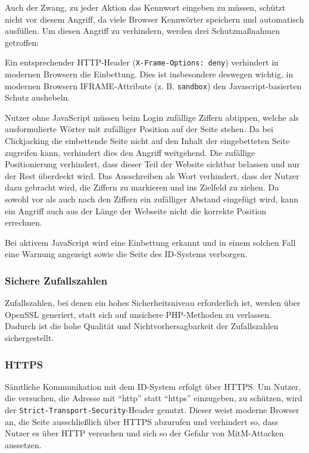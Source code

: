 \documentclass[parskip=half]{scrartcl}
\begin{document}
Auch der Zwang, zu jeder Aktion das Kennwort eingeben zu müssen, schützt nicht vor diesem Angriff, da viele Browser Kennwörter speichern und automatisch ausfüllen.
Um diesen Angriff zu verhindern, werden drei Schutzmaßnahmen getroffen:

Ein entsprechender HTTP-Header (\texttt{X-Frame-Options: deny}) verhindert in modernen Browsern die Einbettung.
Dies ist insbesondere deswegen wichtig, in modernen Browsern IFRAME-Attribute (z. B. \texttt{sandbox}) den Javascript-basierten Schutz aushebeln.

Nutzer ohne JavaScript müssen beim Login zufällige Ziffern abtippen, welche als ausformulierte Wörter mit zufälliger Position auf der Seite stehen.
Da bei Clickjacking die einbettende Seite nicht auf den Inhalt der eingebetteten Seite zugreifen kann, verhindert dies den Angriff weitgehend.
Die zufällige Positionierung verhindert, dass dieser Teil der Website sichtbar belassen und nur der Rest überdeckt wird.
Das Ausschreiben als Wort verhindert, dass der Nutzer dazu gebracht wird, die Ziffern zu markieren und ins Zielfeld zu ziehen.
Da sowohl vor als auch nach den Ziffern ein zufälliger Abstand eingefügt wird, kann ein Angriff auch aus der Länge der Webseite nicht die korrekte Position errechnen.

Bei aktivem JavaScript wird eine Einbettung erkannt und in einem solchen Fall eine Warnung angezeigt sowie die Seite des ID-Systems verborgen.

\subsubsection{Sichere Zufallszahlen}
Zufallszahlen, bei denen ein hohes Sicherheitsniveau erforderlich ist, werden über OpenSSL generiert, statt sich auf unsichere PHP-Methoden zu verlassen.
Dadurch ist die hohe Qualität und Nichtvorhersagbarkeit der Zufallszahlen sichergestellt.

\subsubsection{HTTPS}
Sämtliche Kommunikation mit dem ID-System erfolgt über HTTPS.
Um Nutzer, die versuchen, die Adresse mit "`http"' statt "`https"' einzugeben, zu schützen, wird der \texttt{Strict-Transport-Security}-Header genutzt.
Dieser weist moderne Browser an, die Seite ausschließlich über HTTPS abzurufen und verhindert so,
dass Nutzer es über HTTP versuchen und sich so der Gefahr von MitM-Attacken aussetzen.
\end{document}
